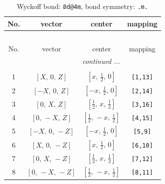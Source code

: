 \documentclass[fleqn,8pt]{jsarticle}
\begin{document}
\begin{longtable}{cccc}
\caption{Wyckoff bond: {\tt 8d@4m}, bond symmetry: {\tt .m.}}
 \\
 \hline \hline
No. & vector & center & mapping \\ \hline \endfirsthead

\multicolumn{3}{l}{\tablename\ \thetable{}} \\
 \hline \hline
No. & vector & center & mapping \\ \hline \endhead

 \hline \hline
\multicolumn{3}{r}{\footnotesize\it continued ...} \\ \endfoot

 \hline \hline
\multicolumn{3}{r}{} \\ \endlastfoot

1 & $\left[ X,\, 0,\, Z \right]$ & $\left[ x,\, \frac{1}{2},\, 0 \right]$ & {\tt [1,13]} \\ \hline
2 & $\left[ - X,\, 0,\, Z \right]$ & $\left[ - x,\, \frac{1}{2},\, 0 \right]$ & {\tt [2,14]} \\ \hline
3 & $\left[ 0,\, X,\, Z \right]$ & $\left[ \frac{1}{2},\, x,\, \frac{1}{2} \right]$ & {\tt [3,16]} \\ \hline
4 & $\left[ 0,\, - X,\, Z \right]$ & $\left[ \frac{1}{2},\, - x,\, \frac{1}{2} \right]$ & {\tt [4,15]} \\ \hline
5 & $\left[ - X,\, 0,\, - Z \right]$ & $\left[ - x,\, \frac{1}{2},\, 0 \right]$ & {\tt [5,9]} \\ \hline
6 & $\left[ X,\, 0,\, - Z \right]$ & $\left[ x,\, \frac{1}{2},\, 0 \right]$ & {\tt [6,10]} \\ \hline
7 & $\left[ 0,\, X,\, - Z \right]$ & $\left[ \frac{1}{2},\, x,\, \frac{1}{2} \right]$ & {\tt [7,12]} \\ \hline
8 & $\left[ 0,\, - X,\, - Z \right]$ & $\left[ \frac{1}{2},\, - x,\, \frac{1}{2} \right]$ & {\tt [8,11]} \\
\end{longtable}
\renewcommand{\arraystretch}{1.2}
\end{document}
